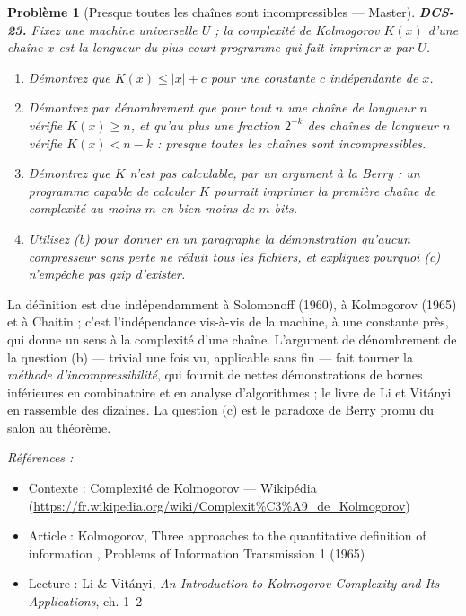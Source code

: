 \documentclass[11pt]{article}
\newtheorem{problem}{Problème}
\newenvironment{refs}{\par\small\noindent\emph{Références :}\begin{itemize}\setlength\itemsep{0pt}}{\end{itemize}\normalsize}
\begin{document}
\bigskip

\begin{problem}[{Presque toutes les chaînes sont incompressibles --- Master}]
\textbf{DCS-23.} Fixez une machine universelle $U$ ; la complexité de Kolmogorov $K(x)$ d'une chaîne $x$ est la longueur du plus court programme qui fait imprimer $x$ par $U$.
\begin{enumerate}
\item[(a)] Démontrez que $K(x) \le |x| + c$ pour une constante $c$ indépendante de $x$.
\item[(b)] Démontrez par dénombrement que pour tout $n$ une chaîne de longueur $n$ vérifie $K(x) \ge n$, et qu'au plus une fraction $2^{-k}$ des chaînes de longueur $n$ vérifie $K(x) < n - k$ : presque toutes les chaînes sont incompressibles.
\item[(c)] Démontrez que $K$ n'est pas calculable, par un argument à la Berry : un programme capable de calculer $K$ pourrait imprimer \og{} la première chaîne de complexité au moins $m$ \fg{} en bien moins de $m$ bits.
\item[(d)] Utilisez (b) pour donner en un paragraphe la démonstration qu'aucun compresseur sans perte ne réduit tous les fichiers, et expliquez pourquoi (c) n'empêche pas gzip d'exister.
\end{enumerate}

\end{problem}

\noindent La définition est due indépendamment à Solomonoff (1960), à Kolmogorov (1965) et à Chaitin ; c'est l'indépendance vis-à-vis de la machine, à une constante près, qui donne un sens à \og{} la \fg{} complexité d'une chaîne. L'argument de dénombrement de la question (b) --- trivial une fois vu, applicable sans fin --- fait tourner la \textit{méthode d'incompressibilité}, qui fournit de nettes démonstrations de bornes inférieures en combinatoire et en analyse d'algorithmes ; le livre de Li et Vitányi en rassemble des dizaines. La question (c) est le paradoxe de Berry promu du salon au théorème.

\begin{refs}
\item Contexte : Complexité de Kolmogorov --- Wikipédia (\url{https://fr.wikipedia.org/wiki/Complexit%C3%A9_de_Kolmogorov})
\item Article : Kolmogorov, \og{} Three approaches to the quantitative definition of information \fg{}, Problems of Information Transmission 1 (1965)
\item Lecture : Li \& Vitányi, \textit{An Introduction to Kolmogorov Complexity and Its Applications}, ch. 1--2
\end{refs}
\end{document}
